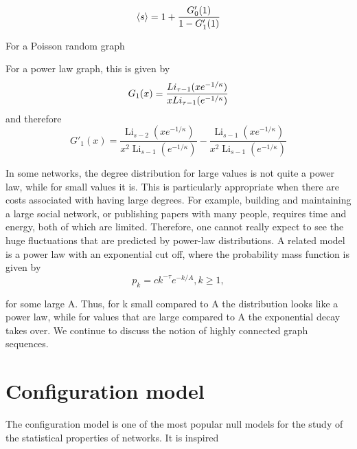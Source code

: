 \begin{equation}
\left< s \right> = 1 + \frac{G'_0(1)}{1-G'_1(1)}	
\end{equation}




For a Poisson random graph







For a power law graph, this is given by
\begin{equation}
	G_1(x) = \frac{Li_{\tau-1} ({xe^{-1/\kappa}})}{xLi_{\tau-1} ({e^{-1/\kappa}})}
\end{equation}
and therefore
\begin{equation}
	G'_1(x) = \frac{\operatorname{Li}_{s - 2} \left(x e^{- 1/\kappa}\right)}
	               {x^{2} \operatorname{Li}_{s - 1}\left(e^{- 1/\kappa}\right)} -
	          \frac{\operatorname{Li}_{s - 1}\left(x e^{- 1/\kappa}\right)}
	               {x^{2} \operatorname{Li}_{s - 1}\left(e^{- 1/\kappa}\right)}
\end{equation}




In some networks, the degree distribution for large values is not quite a power law, while for small values it is. This is particularly appropriate when there are costs associated with having large degrees. For example, building and maintaining a large social network, or publishing papers with many people, requires time and energy, both of which are limited. Therefore, one cannot really expect to see the huge fluctuations that are predicted by power-law distributions. A related model is a power law with an exponential cut off, where the probability mass function is given by
\begin{equation}
	p_k = ck^{-\tau} e^{− k / A}, k \ge 1,
\end{equation}

for some large A. Thus, for k small compared to A the distribution looks like a power law, while for values that are large compared to A the exponential decay takes over.
We continue to discuss the notion of highly connected graph sequences.





\section{Configuration model} %
\label{sec:configuration_model}

The configuration model is one of the most popular null models for the study of the statistical properties of networks.
It is inspired 




